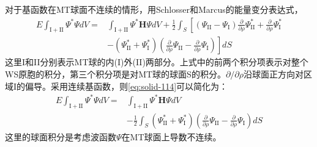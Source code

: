 对于基函数在MT球面不连续的情形，用Schlosser和Marcus的能量变分表达式\cite{PR131-2529_1963}，
\begin{equation}
  \begin{split}
    E\int_{\mathrm{I+II}}\Psi^{\ast}\Psi dV=&\int_{\mathrm{I+II}}\Psi^{\ast}\mathbf H\Psi dV+\frac12\int_S\left[(\Psi_{\mathrm{II}}-\Psi_{\mathrm I})\frac{\partial}{\partial\rho}\Psi_{\mathrm {II}}^{\ast}+\frac{\partial}{\partial\rho}\Psi_{\mathrm I}^{\ast}\right.\\
    &-(\Psi_{\mathrm {II}}^{\ast}+\Psi_{\mathrm I}^{\ast})\left.\left(\frac{\partial}{\partial\rho}\Psi_{\mathrm{II}}-\frac{\partial}{\partial\rho}\Psi_{\mathrm I}\right)\right]dS
  \end{split}
  \label{eq:solid-114}
\end{equation}
这里I和II分别表示MT球的内(I)外(II)两部分。上式中的前两个积分项表示对整个WS原胞的积分，第三个积分项是对MT球的球面S的积分。$\partial/\partial\rho$沿球面正方向对区域I的偏导。采用连续基函数，则\eqref{eq:solid-114}可以简化为：
\begin{equation}
  \begin{split}
    E\int_{\mathrm{I+II}}\Psi^{\ast}\Psi dV=&\int_{\mathrm{I+II}}\Psi^{\ast}\mathbf H\Psi dV\\
    &-\frac12\int_S(\Psi_{\mathrm {II}}^{\ast}+\Psi_{\mathrm I}^{\ast})\left(\frac{\partial}{\partial\rho}\Psi_{\mathrm{II}}-\frac{\partial}{\partial\rho}\Psi_{\mathrm I}\right)dS
  \end{split}
  \label{eq:solid-115}
\end{equation}
这里的球面积分是考虑波函数$\Psi$在MT球面上导数不连续。

